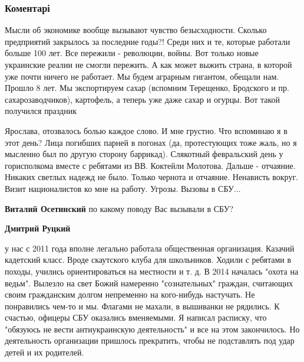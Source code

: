  
 
 
 
 
\subsubsection{Коментарі}

\begin{itemize} %

Мысли об экономике вообще вызывают чувство безысходности. Сколько предприятий
закрылось за последние годы?! Среди них и те, которые работали больше 100 лет.
Все пережили - революции, войны. Вот только новые украинские реалии не смогли
пережить. А как может выжить страна, в которой уже почти ничего не работает. Мы
будем аграрным гигантом, обещали нам. Прошло 8 лет. Мы экспортируем сахар
(вспомним Терещенко, Бродского и пр. сахарозаводчиков), картофель, а теперь уже
даже сахар и огурцы. Вот такой получился праздник


Ярослава, отозвалось болью каждое слово. И мне грустно. Что вспоминаю я в этот
день? Лица погибших парней в погонах (да, протестующих тоже жаль, но я мысленно
был по другую сторону баррикад). Слякотный февральский день у горисполкома
вместе с ребятами из ВВ. Коктейли Молотова. Дальше - отчаяние. Никаких светлых
надежд не было. Только чернота и отчаяние. Ненависть вокруг. Визит
националистов ко мне на работу. Угрозы. Вызовы в СБУ...

\begin{itemize} %
\textbf{Виталий Осетинский} по какому поводу Вас вызывали в СБУ?

\textbf{Дмитрий Руцкий} 

у нас с 2011 года вполне легально работала общественная организация. Казачий
кадетский класс. Вроде скаутского клуба для школьников. Ходили с ребятами в
походы, учились ориентироваться на местности и т. д. В 2014 началась "охота на
ведьм". Вылезло на свет Божий намеренно "сознательных" граждан, считающих своим
гражданским долгом непременно на кого-нибудь настучать. Не понравились чем-то и
мы. Флагами не махали, в вышиванки не рядились. К счастью, офицеры СБУ
оказались вменяемыми. Я написал расписку, что "обязуюсь не вести антиукраинскую
деятельность" и все на этом закончилось. Но деятельность организации пришлось
прекратить, чтобы не подставлять под удар детей и их родителей.


\end{itemize}
\end{itemize}
